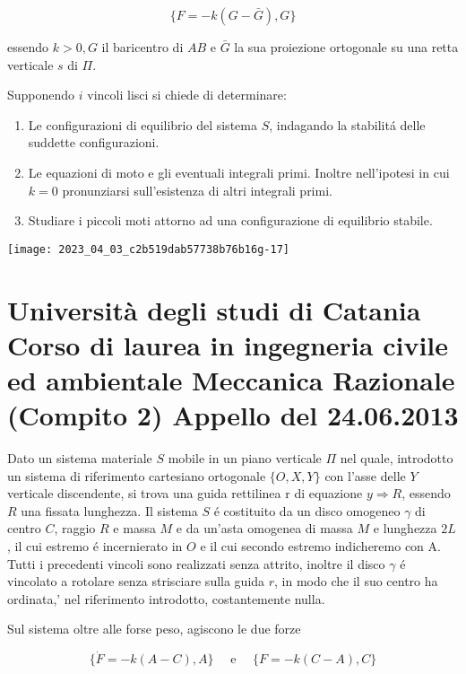 \documentclass[10pt]{article}
\begin{document}
\[
\{F=-k(G-\bar{G}), G\}
\]

essendo \(k>0, G\) il baricentro di \(A B\) e \(\bar{G}\) la sua proiezione ortogonale su una retta verticale \(s\) di \(\Pi\).

Supponendo \(i\) vincoli lisci si chiede di determinare:

\begin{enumerate}
  \item Le configurazioni di equilibrio del sistema \(S\), indagando la stabilitá delle suddette configurazioni.

  \item Le equazioni di moto e gli eventuali integrali primi. Inoltre nell'ipotesi in cui \(k=0\) pronunziarsi sull'esistenza di altri integrali primi.

  \item Studiare i piccoli moti attorno ad una configurazione di equilibrio stabile.

\end{enumerate}

\begin{center}
\texttt{[image: 2023\_04\_03\_c2b519dab57738b76b16g-17]}
\end{center}

\section{Università degli studi di Catania
Corso di laurea in ingegneria civile ed ambientale
Meccanica Razionale (Compito 2)
Appello del 24.06.2013}
Dato un sistema materiale \(S\) mobile in un piano verticale \(\Pi\) nel quale, introdotto un sistema di riferimento cartesiano ortogonale \(\{O, X, Y\}\) con l'asse delle \(Y\) verticale discendente, si trova una guida rettilinea \(\mathrm{r}\) di equazione \(y \Rightarrow R\), essendo \(R\) una fissata lunghezza. Il sistema \(S\) é costituito da un disco omogeneo \(\gamma\) di centro \(C\), raggio \(R\) e massa \(M\) e da un'asta omogenea di massa \(M\) e lunghezza \(2 L\), il cui estremo é incernierato in \(O\) e il cui secondo estremo indicheremo con A. Tutti i precedenti vincoli sono realizzati senza attrito, inoltre il disco \(\gamma\) é vincolato a rotolare senza strisciare sulla guida \(r\), in modo che il suo centro ha ordinata,' nel riferimento introdotto, costantemente nulla.

Sul sistema oltre alle forse peso, agiscono le due forze

\[
\{\dot{F}=-k(A-C), A\} \quad \text { e } \quad\{F=-k(C-A), C\}
\]
\end{document}
